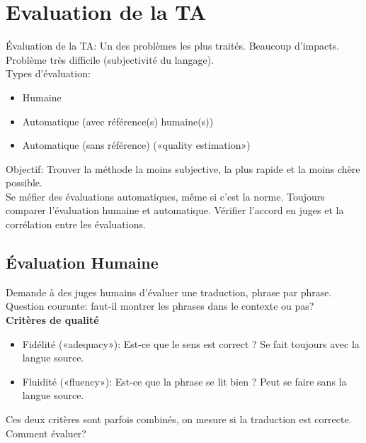 \vspace{-1.2cm}

\section{Evaluation de la TA}

Évaluation de la TA: Un des problèmes les plus traités. Beaucoup d’impacts. Problème très difficile (subjectivité du langage).\\

Types d’évaluation:

\begin{itemize}
    \item Humaine
    \item Automatique (avec référence(s) humaine(s))
    \item Automatique (sans référence) («quality estimation»)\\
\end{itemize}

Objectif: Trouver la méthode la moins subjective, la plus rapide et la moins chère possible.\\

Se méfier des évaluations automatiques, même si c’est la norme. Toujours comparer l’évaluation humaine et automatique. Vérifier l’accord en juges et la corrélation entre les évaluations.

\subsection{Évaluation Humaine}

Demande à des juges humains d’évaluer une traduction, phrase par phrase. Question courante: faut-il montrer les phrases dans le contexte ou pas?\\

\textbf{Critères de qualité}

\begin{itemize}
    \item Fidélité («adequacy»): Est-ce que le sens est correct ? Se fait toujours avec la langue source.
    \item Fluidité («fluency»): Est-ce que la phrase se lit bien ? Peut se faire sans la langue source. \\
\end{itemize}

Ces deux critères sont parfois combinés, on mesure si la traduction est correcte. Comment évaluer?

